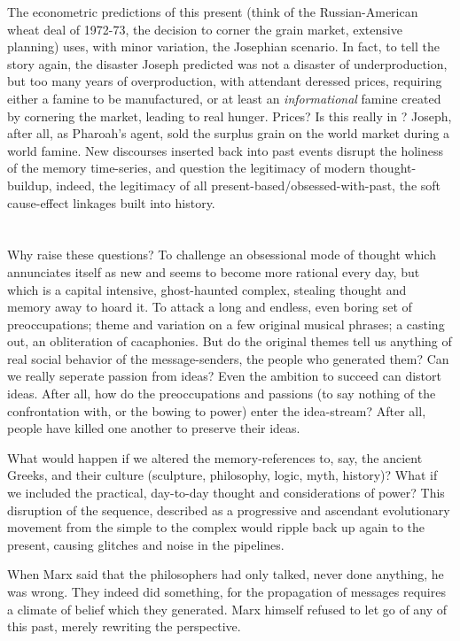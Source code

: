 \documentclass[11pt,twoside,draft]{memoir}
\begin{document}
The econometric predictions of this present (think of the Russian-American wheat
deal of 1972-73, the decision to corner the
grain market, extensive planning) uses, with
minor variation, the Josephian scenario. In
fact, to tell the story again, the disaster
Joseph predicted was not a disaster of underproduction, but too many years of overproduction, with attendant deressed prices, requiring either a famine to be manufactured,
or at least an \emph{informational} famine created
by cornering the market, leading to real
hunger. Prices? Is this really in ?
Joseph, after all, as Pharoah's agent, sold the
surplus grain on the world market during a
world famine. New discourses inserted back
into past events disrupt the holiness of the
memory time-series, and question the legitimacy of modern thought-buildup, indeed,
the legitimacy of all present-based\slash obsessed-with-past, the soft cause-effect linkages built
into history.

\chapter{}

Why raise these questions? To challenge
an obsessional mode of thought which annunciates itself as new and seems to become
more rational every day, but which is a
capital intensive, ghost-haunted complex,
stealing thought and memory away to hoard
it. To attack a long and endless, even boring
set of preoccupations; theme and variation
on a few original musical phrases; a casting
out, an obliteration of cacaphonies. But do
the original themes tell us anything of real
social behavior of the message-senders, the
people who generated them? Can we really
seperate passion from ideas? Even the ambition to succeed can distort ideas. After all,
how do the preoccupations and passions (to
say nothing of the confrontation with, or the
bowing to power) enter the idea-stream?
After all, people have killed one another to
preserve their ideas.

What would happen if we altered the
memory-references to, say, the ancient Greeks,
and their culture
(sculpture, philosophy, logic, myth, history)? What if we
included the practical, day-to-day thought
and considerations of power? This disruption of the sequence, described as a progressive and ascendant evolutionary movement
from the simple to the complex would ripple
back up again to the present, causing glitches
and noise in the pipelines.

When Marx said that the philosophers
had only talked, never done anything, he
was wrong. They indeed did something, for
the propagation of messages requires a climate of belief which they generated. Marx
himself refused to let go of any of this past, merely rewriting the perspective.
\end{document}
